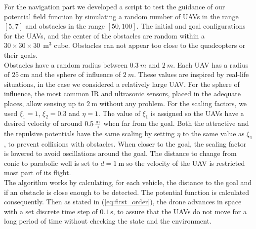\documentclass[journal, twoside]{IEEEtran}
\newcommand*{\subb}[1]{_{\mathrm{#1}}}
\begin{document}
	
	For the navigation part we developed a script to test the guidance of our potential field function by simulating a random number of UAVs in the range $[5,7]$ and obstacles in the range $[50,100]$. The initial and goal configurations for the UAVs, and the center of the obstacles are random within a $30\times 30\times 30   \ \SI{}{\meter^3}$ cube. Obstacles can not appear too close to the quadcopters or their goals.\\
	
	Obstacles have a random radius between $\SI{0.3}{m}$ and $\SI{2}{m}$. Each UAV has a radius of $\SI{25}{\centi\meter}$ and the sphere of influence of $\SI{2}{m}$. These values are inspired by real-life situations, in the case we considered a relatively large UAV. For the sphere of influence, the most common IR and ultrasonic sensors, placed in the adequate places, allow sensing up to $\SI{2}{\meter}$ without any problem. For the scaling factors, we used $\xi\subb{1} = 1$, $\xi\subb{2} = 0.3$ and $\eta = 1$. The value of $\xi\subb{1}$ is assigned so the UAVs have a desired velocity of around $\SI{0.5}{\frac{\meter}{\second}}$ when far from the goal. Both the attractive and the repulsive potentials have the same scaling by setting $\eta$ to the same value as $\xi\subb{1}$, to prevent collisions with obstacles. When closer to the goal, the scaling factor is lowered to avoid oscillations around the goal. The distance to change from conic to parabolic well is set to $d = \SI{1}{\meter}$ so the velocity of the UAV is restricted most part of its flight.\\
	
	The algorithm works by calculating, for each vehicle, the distance to the goal and if an obstacle is close enough to be detected. The potential function is calculated consequently. Then as stated in (\ref{eq:first_order}), the drone advances in space with a set discrete time step of $\SI{0.1}{\second}$, to assure that the UAVs do not move for a long period of time without checking the state and the environment.\\
\end{document}
